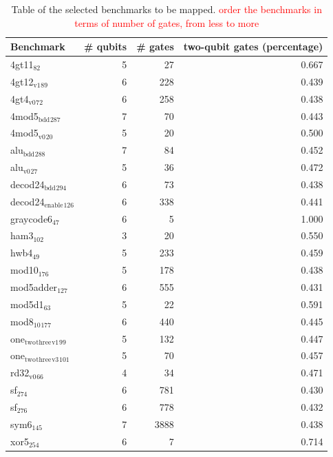 \begin{table}[htbp]
\caption{\label{tab:map_selected_benchs}
Table of the selected benchmarks to be mapped. \textcolor{red}{order the benchmarks in terms of number of gates, from less to more}}
\centering
\small
\begin{tabular}{lrrr}
\hline
Benchmark & \# qubits & \# gates & two-qubit gates (percentage)\\
\hline
4gt11\(_{\text{82}}\) & 5 & 27 & 0.667\\
4gt12\(_{\text{v1}}\)\(_{\text{89}}\) & 6 & 228 & 0.439\\
4gt4\(_{\text{v0}}\)\(_{\text{72}}\) & 6 & 258 & 0.438\\
4mod5\(_{\text{bdd}}\)\(_{\text{287}}\) & 7 & 70 & 0.443\\
4mod5\(_{\text{v0}}\)\(_{\text{20}}\) & 5 & 20 & 0.500\\
alu\(_{\text{bdd}}\)\(_{\text{288}}\) & 7 & 84 & 0.452\\
alu\(_{\text{v0}}\)\(_{\text{27}}\) & 5 & 36 & 0.472\\
decod24\(_{\text{bdd}}\)\(_{\text{294}}\) & 6 & 73 & 0.438\\
decod24\(_{\text{enable}}\)\(_{\text{126}}\) & 6 & 338 & 0.441\\
graycode6\(_{\text{47}}\) & 6 & 5 & 1.000\\
ham3\(_{\text{102}}\) & 3 & 20 & 0.550\\
hwb4\(_{\text{49}}\) & 5 & 233 & 0.459\\
mod10\(_{\text{176}}\) & 5 & 178 & 0.438\\
mod5adder\(_{\text{127}}\) & 6 & 555 & 0.431\\
mod5d1\(_{\text{63}}\) & 5 & 22 & 0.591\\
mod8\(_{\text{10}}\)\(_{\text{177}}\) & 6 & 440 & 0.445\\
one\(_{\text{two}}\)\(_{\text{three}}\)\(_{\text{v1}}\)\(_{\text{99}}\) & 5 & 132 & 0.447\\
one\(_{\text{two}}\)\(_{\text{three}}\)\(_{\text{v3}}\)\(_{\text{101}}\) & 5 & 70 & 0.457\\
rd32\(_{\text{v0}}\)\(_{\text{66}}\) & 4 & 34 & 0.471\\
sf\(_{\text{274}}\) & 6 & 781 & 0.430\\
sf\(_{\text{276}}\) & 6 & 778 & 0.432\\
sym6\(_{\text{145}}\) & 7 & 3888 & 0.438\\
xor5\(_{\text{254}}\) & 6 & 7 & 0.714\\
\hline
\end{tabular}
\end{table}


